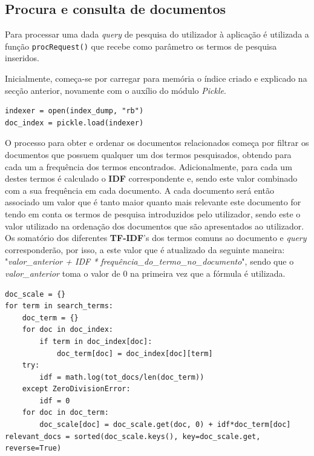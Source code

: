 \documentclass{article}
\begin{document}
\subsection{Procura e consulta de documentos}

Para processar uma dada \emph{query} de pesquisa do utilizador à aplicação é utilizada a função \texttt{procRequest()} que recebe como parâmetro os termos de pesquisa inseridos.

Inicialmente, começa-se por carregar para memória o índice criado e explicado na secção anterior, novamente com o auxílio do módulo \emph{Pickle}.

\begin{verbatim}
indexer = open(index_dump, "rb")
doc_index = pickle.load(indexer)
\end{verbatim}

O processo para obter e ordenar os documentos relacionados começa por filtrar os documentos que possuem qualquer um dos termos pesquisados, obtendo para cada um
a frequência dos termos encontrados. Adicionalmente, para cada um destes termos é calculado o \textbf{IDF} correspondente e, sendo este valor combinado com a 
sua frequência em cada documento. A cada documento será então associado um valor que é tanto maior quanto mais relevante este documento for tendo em conta os termos
de pesquisa introduzidos pelo utilizador, sendo este o valor utilizado na ordenação dos documentos que são apresentados ao utilizador. Os somatório dos diferentes 
\textbf{TF-IDF}'s dos termos comuns ao documento e \textit{query} corresponderão, por isso, a este valor que é atualizado da seguinte maneira: 
"\textit{valor\_anterior + IDF * frequência\_do\_termo\_no\_documento}", sendo que o \emph{valor\_anterior} toma o valor de 0 na primeira vez que a fórmula é 
utilizada. 

\begin{verbatim}
doc_scale = {}
for term in search_terms:
    doc_term = {}
    for doc in doc_index:
        if term in doc_index[doc]:
            doc_term[doc] = doc_index[doc][term]
    try:
        idf = math.log(tot_docs/len(doc_term))
    except ZeroDivisionError:
        idf = 0
    for doc in doc_term:
        doc_scale[doc] = doc_scale.get(doc, 0) + idf*doc_term[doc]
relevant_docs = sorted(doc_scale.keys(), key=doc_scale.get, reverse=True)
\end{verbatim}
\end{document}
